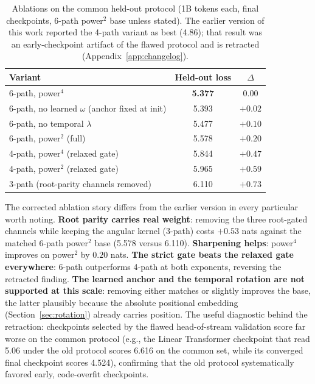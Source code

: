 \documentclass{article}
\begin{document}
\begin{table}[t]
\centering
\caption{Ablations on the common held-out protocol (1B tokens each, final checkpoints, 6-path power$^2$ base unless stated). The earlier version of this work reported the 4-path variant as best (4.86); that result was an early-checkpoint artifact of the flawed protocol and is retracted (Appendix~\ref{app:changelog}).}
\label{tab:ablation}
\small
\begin{tabular}{lcc}
\toprule
Variant & Held-out loss & $\Delta$ \\
\midrule
6-path, power$^4$ & \textbf{5.377} & 0.00 \\
6-path, no learned $\omega$ (anchor fixed at init) & 5.393 & $+0.02$ \\
6-path, no temporal $\lambda$ & 5.477 & $+0.10$ \\
6-path, power$^2$ (full) & 5.578 & $+0.20$ \\
4-path, power$^4$ (relaxed gate) & 5.844 & $+0.47$ \\
4-path, power$^2$ (relaxed gate) & 5.965 & $+0.59$ \\
3-path (root-parity channels removed) & 6.110 & $+0.73$ \\
\bottomrule
\end{tabular}
\end{table}

The corrected ablation story differs from the earlier version in every particular worth noting. \textbf{Root parity carries real weight}: removing the three root-gated channels while keeping the angular kernel (3-path) costs $+0.53$ nats against the matched 6-path power$^2$ base (5.578 versus 6.110). \textbf{Sharpening helps}: power$^4$ improves on power$^2$ by $0.20$ nats. \textbf{The strict gate beats the relaxed gate everywhere}: 6-path outperforms 4-path at both exponents, reversing the retracted finding. \textbf{The learned anchor and the temporal rotation are not supported at this scale}: removing either matches or slightly improves the base, the latter plausibly because the absolute positional embedding (Section~\ref{sec:rotation}) already carries position. The useful diagnostic behind the retraction: checkpoints selected by the flawed head-of-stream validation score far worse on the common protocol (e.g., the Linear Transformer checkpoint that read 5.06 under the old protocol scores 6.616 on the common set, while its converged final checkpoint scores 4.524), confirming that the old protocol systematically favored early, code-overfit checkpoints.
\end{document}
